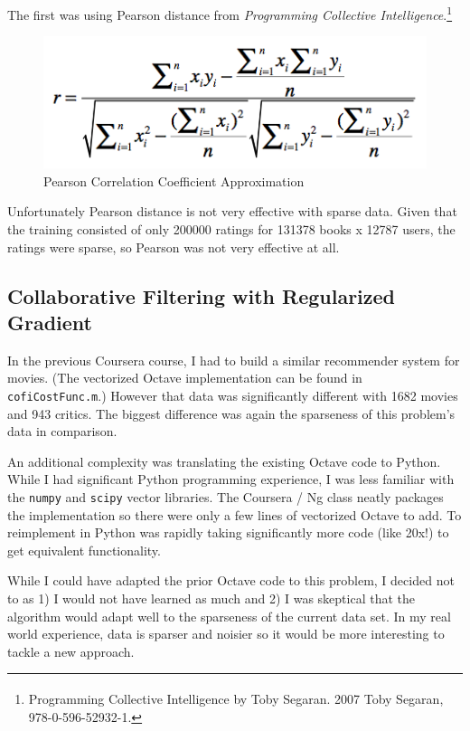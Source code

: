 \documentclass[11pt, oneside]{article}   	%
\begin{document}
The first was using Pearson distance from \emph{Programming Collective Intelligence}.\footnote{Programming Collective Intelligence by Toby Segaran. \textsuperscript{\textcopyright} 2007 Toby Segaran, 978-0-596-52932-1.}

\begin{figure}[h!]
\centering
\includegraphics[scale=0.6]{pearson}
\caption{Pearson Correlation Coefficient Approximation}
\end{figure}

Unfortunately Pearson distance is not very effective with sparse data. Given that the training consisted of only 200000 ratings for 131378 books x 12787 users, the ratings were sparse, so Pearson was not very effective at all.

\subsection*{Collaborative Filtering with Regularized Gradient}

\par In the previous Coursera course, I had to build a similar recommender system for movies. (The vectorized Octave implementation can be found in \texttt{cofiCostFunc.m}.) However that data was significantly different with 1682 movies and 943 critics. The biggest difference was again the sparseness of this problem's data in comparison.

An additional complexity was translating the existing Octave code to Python. While I had significant Python programming experience, I was less familiar with the \texttt{numpy} and \texttt{scipy} vector libraries. The Coursera / Ng class neatly packages the implementation so there were only a few lines of vectorized Octave to add. To reimplement in Python was rapidly taking significantly more code (like 20x!) to get equivalent functionality. 

While I could have adapted the prior Octave code to this problem, I decided not to as 1) I would not have learned as much and 2) I was skeptical that the algorithm would adapt well to the sparseness of the current data set. In my real world experience, data is sparser and noisier so it would be more interesting to tackle a new approach.
\end{document}
